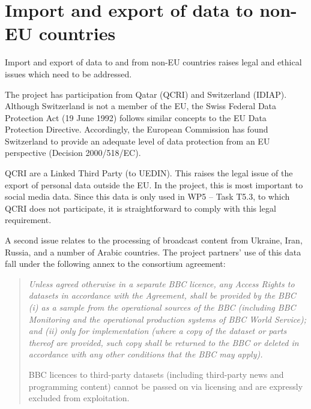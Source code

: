 \section{Import and export of data to non-EU countries}
\label{sec:nonEU}

Import and export of data to and from non-EU countries raises legal and ethical issues which need to be addressed.

The project has participation from Qatar (QCRI) and Switzerland (IDIAP).  Although Switzerland is not a member of the EU, the Swiss Federal Data Protection Act (19 June 1992) follows similar concepts to the EU Data Protection Directive. Accordingly, the European Commission has found Switzerland to provide an adequate level of data protection from an EU perspective (Decision 2000/518/EC). 

QCRI are a Linked Third Party (to UEDIN). This raises the legal issue of the export of personal data outside the EU.  In the \project project, this is most important to social media data.  Since this data is only used in WP5 -- Task T5.3, to which QCRI does not participate, it is  straightforward to comply with this legal requirement.

A second issue relates to the processing of broadcast content from Ukraine, Iran, Russia, and a number of Arabic countries.  The project partners' use of this data fall under the following annex to the consortium agreement:
\begin{quote}
{\it 
Unless agreed otherwise in a separate BBC licence, any Access Rights to datasets in accordance with the Agreement, shall be provided by the BBC (i) as a sample from the operational sources of the BBC (including BBC Monitoring and the operational production systems of BBC World Service); and (ii) only for implementation (where a copy of the dataset or parts thereof are provided, such copy shall be returned to the BBC or deleted in accordance with any other conditions that the BBC may apply).

BBC licences to third-party datasets (including third-party news and programming content) cannot be passed on via licensing and are expressly excluded from exploitation.}
\end{quote}


    
    